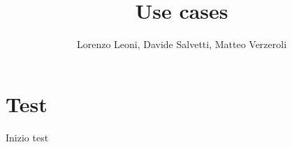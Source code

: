 \documentclass[
		a4paper,
		cleardoublepage=empty,
		headings=twolinechapter,
		numbers=autoenddot,
]{article}
\title{Use cases}
\author{Lorenzo Leoni, Davide Salvetti, Matteo Verzeroli}
\begin{document}
	\maketitle
	\section{Test}
	Inizio test
\end{document}
